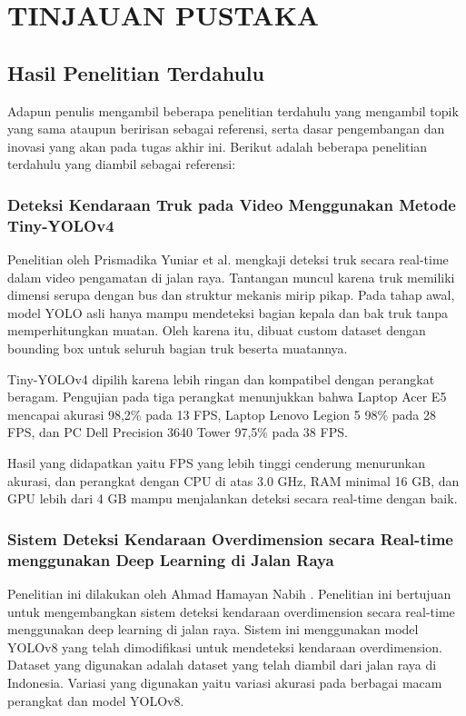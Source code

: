 \chapter{TINJAUAN PUSTAKA}
\label{chap:tinjauanpustaka}


\section{Hasil Penelitian Terdahulu}
\label{sec:hasilpenelitianterdahulu}
Adapun penulis mengambil beberapa penelitian terdahulu yang mengambil topik yang sama ataupun beririsan sebagai referensi, serta dasar pengembangan dan inovasi yang akan pada tugas akhir ini. Berikut adalah beberapa penelitian terdahulu yang diambil sebagai referensi:

\subsection{Deteksi Kendaraan Truk pada Video Menggunakan Metode Tiny-YOLOv4}
\label{subsec:deteksikendaraantrukprismadika}
Penelitian oleh Prismadika Yuniar et al. \parencite*{prismadika2023} mengkaji deteksi truk secara real-time dalam video pengamatan di jalan raya. Tantangan muncul karena truk memiliki dimensi serupa dengan bus dan struktur mekanis mirip pikap. Pada tahap awal, model YOLO asli hanya mampu mendeteksi bagian kepala dan bak truk tanpa memperhitungkan muatan. Oleh karena itu, dibuat custom dataset dengan bounding box untuk seluruh bagian truk beserta muatannya.

Tiny-YOLOv4 dipilih karena lebih ringan dan kompatibel dengan perangkat beragam. Pengujian pada tiga perangkat menunjukkan bahwa Laptop Acer E5 mencapai akurasi 98,2\% pada 13 FPS, Laptop Lenovo Legion 5 98\% pada 28 FPS, dan PC Dell Precision 3640 Tower 97,5\% pada 38 FPS. 

Hasil yang didapatkan yaitu FPS yang lebih tinggi cenderung menurunkan akurasi, dan perangkat dengan CPU di atas 3.0 GHz, RAM minimal 16 GB, dan GPU lebih dari 4 GB mampu menjalankan deteksi secara real-time dengan baik.

\subsection{Sistem Deteksi Kendaraan Overdimension secara Real-time menggunakan Deep Learning di Jalan Raya}
\label{subsec:deteksikendaraanoverdimensionhamayan}
Penelitian ini dilakukan oleh Ahmad Hamayan Nabih \parencite*{hamayan2024}. Penelitian ini bertujuan untuk mengembangkan sistem deteksi kendaraan overdimension secara real-time menggunakan deep learning di jalan raya. Sistem ini menggunakan model YOLOv8 yang telah dimodifikasi untuk mendeteksi kendaraan overdimension. Dataset yang digunakan adalah dataset yang telah diambil dari jalan raya di Indonesia. Variasi yang digunakan yaitu variasi akurasi pada berbagai macam perangkat dan model YOLOv8.

